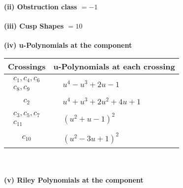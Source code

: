 \documentclass[1p]{elsarticle_modified}
\theoremstyle{definition}
\begin{document}
\flushleft \textbf{(ii) Obstruction class $= -1$}\\~\\
\flushleft \textbf{(iii) Cusp Shapes $= 10$}\\~\\
\newpage\renewcommand{\arraystretch}{1}
\flushleft \textbf{(iv) u-Polynomials at the component}\newline \\
\begin{tabular}{m{50pt}|m{274pt}}
Crossings & \hspace{64pt}u-Polynomials at each crossing \\
\hline $$\begin{aligned}c_{1},c_{4},c_{6}\\c_{8},c_{9}\end{aligned}$$&$\begin{aligned}
&u^4- u^3+2 u-1
\end{aligned}$\\
\hline $$\begin{aligned}c_{2}\end{aligned}$$&$\begin{aligned}
&u^4+u^3+2 u^2+4 u+1
\end{aligned}$\\
\hline $$\begin{aligned}c_{3},c_{5},c_{7}\\c_{11}\end{aligned}$$&$\begin{aligned}
&(u^2+u-1)^2
\end{aligned}$\\
\hline $$\begin{aligned}c_{10}\end{aligned}$$&$\begin{aligned}
&(u^2-3 u+1)^2
\end{aligned}$\\
\hline
\end{tabular}\\~\\
\newpage\renewcommand{\arraystretch}{1}
\flushleft \textbf{(v) Riley Polynomials at the component}\newline \\
\end{document}
